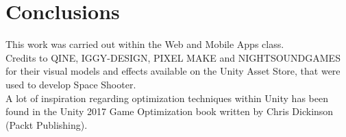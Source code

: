 \documentclass[sigconf]{acmart}
\begin{document}
\section{Conclusions}

\begin{acks}
This work was carried out within the Web and Mobile Apps class. \\
Credits to QINE, IGGY-DESIGN, PIXEL MAKE and NIGHTSOUNDGAMES for their visual models and effects available on the Unity Asset Store, that were used to develop Space Shooter. \\
A lot of inspiration regarding optimization techniques within Unity has been found in the Unity 2017 Game Optimization book written by Chris Dickinson (Packt Publishing).
\end{acks}



\end{document}

